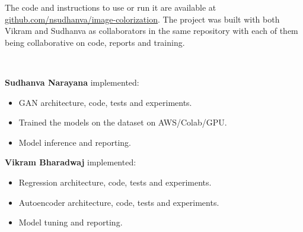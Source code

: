 \documentclass{article}
\begin{document}
The code and instructions to use or run it are available 
at \url{github.com/nsudhanva/image-colorization}. 
The project was built with both Vikram and Sudhanva as collaborators in the same repository with each of them being collaborative on code, reports and training.

\

\textbf{Sudhanva Narayana} implemented:
\begin{itemize}
\item GAN architecture, code, tests and experiments.
\item Trained the models on the dataset on AWS/Colab/GPU.
\item Model inference and reporting.
\end{itemize}



\textbf{Vikram Bharadwaj} implemented:
\begin{itemize}
\item Regression architecture, code, tests and experiments.
\item Autoencoder architecture, code, tests and experiments.
\item Model tuning and reporting.
\end{itemize}



\end{document}
